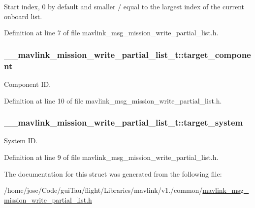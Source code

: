 Start index, 0 by default and smaller / equal to the largest index of the current onboard list. 



Definition at line 7 of file mavlink\-\_\-msg\-\_\-mission\-\_\-write\-\_\-partial\-\_\-list.\-h.

\hypertarget{struct____mavlink__mission__write__partial__list__t_a3e0c142d5a465fe2bf22e8c728be4a58}{
\subsubsection[{target\-\_\-component}]{ \-\_\-\-\_\-mavlink\-\_\-mission\-\_\-write\-\_\-partial\-\_\-list\-\_\-t\-::target\-\_\-component}}\label{struct____mavlink__mission__write__partial__list__t_a3e0c142d5a465fe2bf22e8c728be4a58}


Component I\-D. 



Definition at line 10 of file mavlink\-\_\-msg\-\_\-mission\-\_\-write\-\_\-partial\-\_\-list.\-h.

\hypertarget{struct____mavlink__mission__write__partial__list__t_aa5e77ea55d7e908035fab2d1b0beb898}{
\subsubsection[{target\-\_\-system}]{ \-\_\-\-\_\-mavlink\-\_\-mission\-\_\-write\-\_\-partial\-\_\-list\-\_\-t\-::target\-\_\-system}}\label{struct____mavlink__mission__write__partial__list__t_aa5e77ea55d7e908035fab2d1b0beb898}


System I\-D. 



Definition at line 9 of file mavlink\-\_\-msg\-\_\-mission\-\_\-write\-\_\-partial\-\_\-list.\-h.



The documentation for this struct was generated from the following file\-:\begin{DoxyCompactItemize}
\item 
/home/jose/\-Code/gui\-Tau/flight/\-Libraries/mavlink/v1./common/\hyperlink{mavlink__msg__mission__write__partial__list_8h}{mavlink\-\_\-msg\-\_\-mission\-\_\-write\-\_\-partial\-\_\-list.\-h}\end{DoxyCompactItemize}
